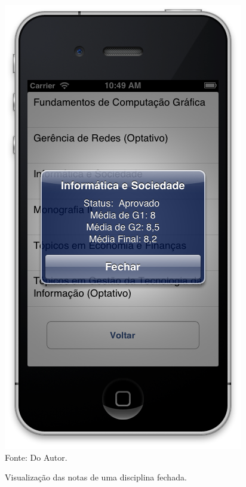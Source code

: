 \begin{figure}[!htb]
     \centering
     \caption[Formulário Notas da Graduação - Visualização de Disciplina Fechada]{Visualização das notas de uma disciplina fechada.}
     \includegraphics[scale=0.38]{imagens/formvisualizacaomediassemdetalhes.png}
     \\  Fonte: Do Autor.
\end{figure}
